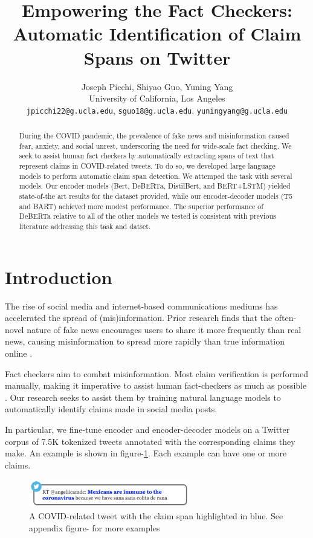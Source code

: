 \documentclass[11pt]{article}
\title{Empowering the Fact Checkers: Automatic Identification of Claim Spans on Twitter}
\author{Joseph Picchi, Shiyao Guo, Yuning Yang \\
        University of California, Los Angeles \\
        \texttt{jpicchi22@g.ucla.edu}, \texttt{sguo18@g.ucla.edu}, \texttt{yuningyang@g.ucla.edu}
        }
\begin{document}
\maketitle
\begin{abstract}
During the COVID pandemic, the prevalence of fake news and misinformation caused fear, anxiety, and social unrest, underscoring the need for wide-scale fact checking. We seek to assist human fact checkers by automatically extracting spans of text that represent claims in COVID-related tweets. To do so, we developed large language models to perform automatic claim span detection. We attemped the task with several models. Our encoder models (Bert, DeBERTa, DistilBert, and BERT+LSTM) yielded state-of-the art results for the dataset provided, while our encoder-decoder models (T5 and BART) achieved more modest performance. The superior performance of DeBERTa relative to all of the other models we tested is consistent with previous literature addressing this task and datset.
\end{abstract}

\section{Introduction}

The rise of social media and internet-based communications mediums has accelerated the spread of (mis)information. Prior research finds that the often-novel nature of fake news encourages users to share it more frequently than real news, causing misinformation to spread more rapidly than true information online \cite{false-news-spreads}.

Fact checkers aim to combat misinformation. Most claim verification is performed manually, making it imperative to assist human fact-checkers as much as possible \cite{fact-checking-is-manual}. Our research seeks to assist them by training natural language models to automatically identify claims made in social media posts.

In particular, we fine-tune encoder and encoder-decoder models on a Twitter corpus of 7.5K tokenized tweets annotated with the corresponding claims they make. An example is shown in figure-\ref{fig: 1-tweet}. Each example can have one or more claims.

\begin{figure}[]
    \centering
    \includegraphics[width=7cm]{images/1-tweet.png}
    \caption{A COVID-related tweet with the claim span highlighted in blue. See appendix figure- for more examples}
    \label{fig: 1-tweet}
\end{figure}
\end{document}
